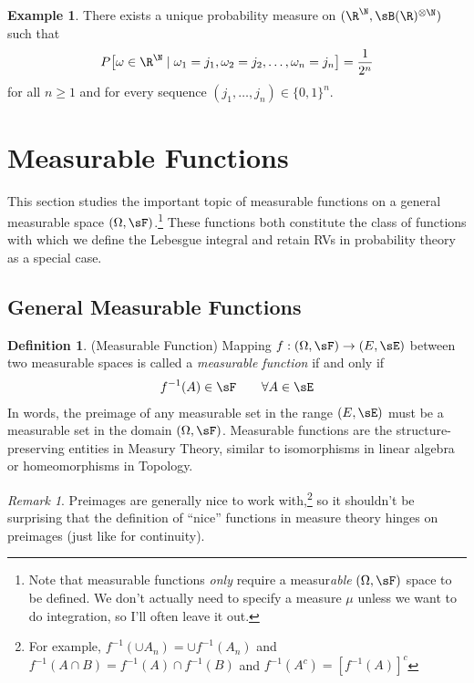 \documentclass[12pt]{article}
\theoremstyle{plain}
\theoremstyle{definition}
\newtheorem{defn}[thm]{Definition}
\newtheorem{ex}[thm]{Example}
\theoremstyle{remark}
\newtheorem*{rmk}{Remark}
\newcommand{\ra}{\rightarrow}
\begin{document}
\begin{ex}
There exists a unique probability measure on
$(\R^{\N},\sB(\R)^{\otimes \N})$ such that
\begin{align*}
  P\big[
    \omega\in \R^{\N} \; |\;
    \omega_1 = j_1, \omega_2=j_2,\ldots,\omega_n=j_n
  \big]
  = \frac{1}{2^n}
\end{align*}
for all $n\geq 1$ and for every sequence $(j_1,\ldots,j_n)\in\{0,1\}^n$.
\end{ex}


\clearpage
\section{Measurable Functions}

This section studies the important topic of measurable functions on a
general measurable space $(\Omega,\sF)$.\footnote{%
  Note that measurable functions \emph{only} require a measur\emph{able}
  $(\Omega,\sF)$ space to be defined. We don't actually need to specify
  a measure $\mu$ unless we want to do integration, so I'll often leave
  it out.
}
These functions both constitute the class of functions with which
we define the Lebesgue integral and retain RVs in probability theory as
a special case.


\subsection{General Measurable Functions}

\begin{defn}(Measurable Function)
Mapping $f:(\Omega,\sF)\ra (E,\sE)$ between two measurable spaces is
called a \emph{measurable function} if and only if
\begin{align*}
  f^{-1}(A) \in \sF \qquad \forall A\in \sE
\end{align*}
In words, the preimage of any measurable set in the range $(E,\sE)$
must be a measurable set in the domain $(\Omega,\sF)$.
Measurable functions are the structure-preserving entities in Measury
Theory, similar to isomorphisms in linear algebra or homeomorphisms in
Topology.
\end{defn}

\begin{rmk}
Preimages are generally nice to work with,\footnote{%
  For example, $f^{-1}\left( \cup A_n \right) = \cup f^{-1}(A_n)$ and
  $f^{-1}(A\cap B) = f^{-1}(A)\cap f^{-1}(B)$ and $f^{-1}(A^c)=
  [f^{-1}(A)]^c$
}
so it shouldn't be surprising that the definition of ``nice'' functions
in measure theory hinges on preimages (just like for continuity).
\end{rmk}
\end{document}
